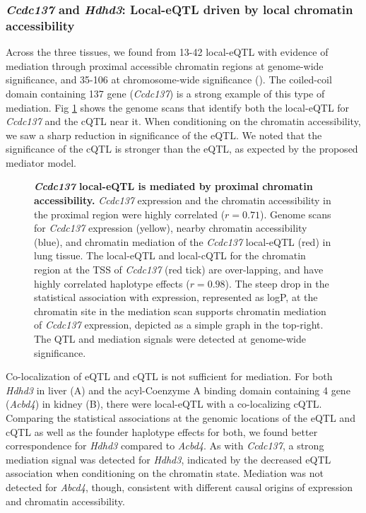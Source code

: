 \documentclass[10pt,letterpaper]{article}
\begin{document}
\subsubsection*{\textit{Ccdc137} and \textit{Hdhd3}: Local-eQTL driven by local chromatin accessibility}
Across the three tissues, we found from 13-42 local-eQTL with evidence of mediation through proximal accessible chromatin regions at genome-wide significance, and 35-106 at chromosome-wide significance (). The coiled-coil domain containing 137 gene (\textit{Ccdc137}) is a strong example of this type of mediation. Fig \ref{fig:ccdc137_mediation} shows the genome scans that identify both the local-eQTL for \textit{Ccdc137} and the cQTL near it. 
When conditioning on the chromatin accessibility, we saw a sharp reduction in significance of the eQTL. We noted that the significance of the cQTL is stronger than the eQTL, as expected by the proposed mediator model. 

\begin{figure}[h!]
\caption{\textbf{\textit{Ccdc137} local-eQTL is mediated by proximal chromatin accessibility.} \textit{Ccdc137} expression and the chromatin accessibility in the proximal region were highly correlated ($r = 0.71$). Genome scans for \textit{Ccdc137} expression (yellow), nearby chromatin accessibility (blue), and chromatin mediation of the \textit{Ccdc137} local-eQTL (red) in lung tissue. The local-eQTL and local-cQTL for the chromatin region at the TSS of \textit{Ccdc137} (red tick) are over-lapping, and have highly correlated haplotype effects ($r = 0.98$). The steep drop in the statistical association with expression, represented as logP, at the chromatin site in the mediation scan supports chromatin mediation of \textit{Ccdc137} expression, depicted as a simple graph in the top-right. The QTL and mediation signals were detected at genome-wide significance. \label{fig:ccdc137_mediation}}
\end{figure}

Co-localization of eQTL and cQTL is not sufficient for mediation. For both \textit{Hdhd3} in liver (A) and the acyl-Coenzyme A binding domain containing 4 gene (\textit{Acbd4}) in kidney (B), there were local-eQTL with a co-localizing cQTL. Comparing the statistical associations at the genomic locations of the eQTL and cQTL as well as the founder haplotype effects for both, we found better correspondence for \textit{Hdhd3} compared to \textit{Acbd4}. As with \textit{Ccdc137}, a strong mediation signal was detected for \textit{Hdhd3}, indicated by the decreased eQTL association when conditioning on the chromatin state. Mediation was not detected for \textit{Abcd4}, though, consistent with different causal origins of expression and chromatin accessibility.
\end{document}
